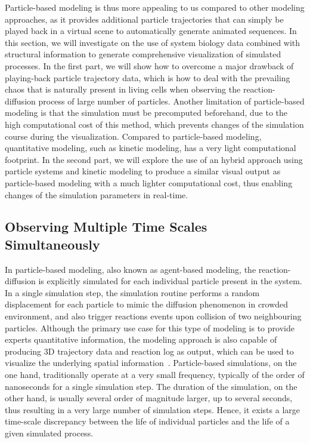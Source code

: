 Particle-based modeling is thus more appealing to us compared to other modeling approaches, as it provides additional particle trajectories that can simply be played back in a virtual scene to automatically generate animated sequences.
In this section, we will investigate on the use of system biology data combined with structural information to generate comprehensive visualization of simulated processes.
In the first part, we will show how to overcome a major drawback of playing-back particle trajectory data, which is how to deal with the prevailing chaos that is naturally present in living cells when observing the reaction-diffusion process of large number of particles.
Another limitation of particle-based modeling is that the simulation must be precomputed beforehand, due to the high computational cost of this method, which prevents changes of the simulation course during the visualization.
Compared to particle-based modeling, quantitative modeling, such as kinetic modeling, has a very light computational footprint.
In the second part, we will explore the use of an hybrid approach using particle systems and kinetic modeling to produce a similar visual output as particle-based modeling with a much lighter computational cost, thus enabling changes of the simulation parameters in real-time. 

\subsection{Observing Multiple Time Scales Simultaneously}

In particle-based modeling, also known as agent-based modeling, the reaction-diffusion is explicitly simulated for each individual particle present in the system.
In a single simulation step, the simulation routine performs a random displacement for each particle to mimic the diffusion phenomenon in crowded environment, and also trigger reactions events upon collision of two neighbouring particles.
Although the primary use case for this type of modeling is to provide experts quantitative information, the modeling approach is also capable of producing 3D trajectory data and reaction log as output, which can be used to visualize the underlying spatial information~\cite{falk2009visualization}.
Particle-based simulations, on the one hand, traditionally operate at a very small frequency, typically of the order of nanoseconds for a single simulation step.  
The duration of the simulation, on the other hand, is usually several order of magnitude larger, up to several seconds, thus resulting in a very large number of simulation steps.
Hence, it exists a large time-scale discrepancy between the life of individual particles and the life of a given simulated process.

